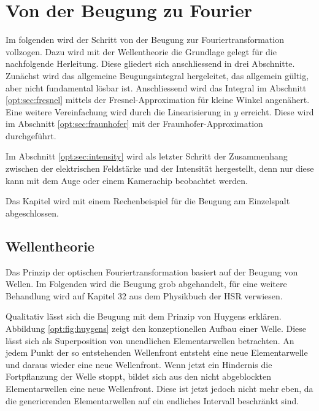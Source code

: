 %
%
%
%
\section{Von der Beugung zu Fourier\label{opt:section:grundlagen}}

Im folgenden wird der Schritt von der Beugung zur Fouriertransformation vollzogen.
Dazu wird mit der Wellentheorie die Grundlage gelegt für die nachfolgende Herleitung.
Diese gliedert sich anschliessend in drei Abschnitte. 
Zunächst wird das allgemeine Beugungsintegral hergeleitet, das allgemein gültig, aber nicht fundamental lösbar ist.
Anschliessend wird das Integral im Abschnitt \ref{opt:sec:fresnel} mittels der Fresnel-Approximation für kleine Winkel angenähert.
Eine weitere Vereinfachung wird durch die Linearisierung in $y$ erreicht. 
Diese wird im Abschnitt \ref{opt:sec:fraunhofer} mit der Fraunhofer-Approximation durchgeführt.

Im Abschnitt \ref{opt:sec:intensity} wird als letzter Schritt der Zusammenhang zwischen der elektrischen Feldstärke und der Intensität hergestellt, denn nur diese kann mit dem Auge oder einem Kamerachip beobachtet werden.

Das Kapitel wird mit einem Rechenbeispiel für die Beugung am Einzelspalt abgeschlossen. 

\subsection{Wellentheorie}
\label{opt:subsection:huygens}
Das Prinzip der optischen Fouriertransformation basiert auf der Beugung von Wellen.
Im Folgenden wird die Beugung grob abgehandelt, für eine weitere Behandlung wird auf Kapitel 32 aus dem Physikbuch der HSR \cite{opt:HSR:Physik2} verwiesen.

Qualitativ lässt sich die Beugung mit dem Prinzip von Huygens erklären. 
Abbildung \ref{opt:fig:huygens} zeigt den konzeptionellen Aufbau einer Welle.
Diese lässt sich als Superposition von unendlichen Elementarwellen betrachten.
An jedem Punkt der so entstehenden Wellenfront entsteht eine neue Elementarwelle und daraus wieder eine neue Wellenfront.
Wenn jetzt ein Hindernis die Fortpflanzung der Welle stoppt, bildet sich aus den nicht abgeblockten Elementarwellen eine neue Wellenfront.
Diese ist jetzt jedoch nicht mehr eben, da die generierenden Elementarwellen auf ein endliches Intervall beschränkt sind.

